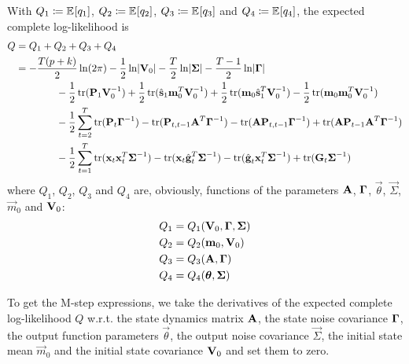 		With \( Q_1 \coloneqq \mathbb{E}_{}[q_1] \), \(  Q_2 \coloneqq \mathbb{E}_{}[q_2] \), \( Q_3 \coloneqq \mathbb{E}_{}[q_3] \) and \( Q_4 \coloneqq \mathbb{E}_{}[q_4] \), the expected complete log-likelihood is
		\begin{align*}
			Q
				&= Q_1 + Q_2 + Q_3 + Q_4 \\
				&= -\frac{T \paren{p + k}}{2} \ln \paren{2\pi} - \frac{1}{2} \ln \Det{\mat{V}_0} - \frac{T}{2} \ln \Det{\mat{\Sigma}} - \frac{T - 1}{2} \ln \Det{\mat{\Gamma}} \\
				&\qquad\qquad -\frac{1}{2} \tr\paren{\mat{P}_1 \mat{V}_0^{-1}} + \frac{1}{2} \tr\paren{\hat{\vec{s}}_1 \vec{m}_0^T \mat{V}_0^{-1}} + \frac{1}{2} \tr\paren{\vec{m}_0 \hat{\vec{s}}_1^T \mat{V}_0^{-1}} - \frac{1}{2} \tr\paren{\vec{m}_0 \vec{m}_0^T \mat{V}_0^{-1}} \\
				&\qquad\qquad -\frac{1}{2} \sum_{t = 2}^{T} \tr\paren{\mat{P}_t \mat{\Gamma}^{-1}} - \tr\paren{\mat{P}_{t, t - 1} \mat{A}^T \mat{\Gamma}^{-1}} - \tr\paren{\mat{A} \mat{P}_{t, t - 1} \mat{\Gamma}^{-1}} + \tr\paren{\mat{A} \mat{P}_{t - 1} \mat{A}^T \mat{\Gamma}^{-1}} \\
				&\qquad\qquad -\frac{1}{2} \sum_{t = 1}^{T} \tr\paren{ \vec{x}_t \vec{x}_t^T \mat{\Sigma}^{-1} } - \tr\paren{ \vec{x}_t \hat{\vec{g}}_t^T \mat{\Sigma}^{-1} } - \tr\paren{ \hat{\vec{g}}_t \vec{x}_t^T \mat{\Sigma}^{-1} } + \tr\paren{ \mat{G}_t \mat{\Sigma}^{-1} }
		\end{align*}
		where \( Q_1 \), \( Q_2 \), \( Q_3 \) and \( Q_4 \) are, obviously, functions of the parameters \( \boldsymbol{\mathrm{A}} \), \( \boldsymbol{\mathrm{\Gamma}} \), \( \vec{\theta} \), \( \vec{\Sigma} \), \( \vec{m}_0 \) and \( \boldsymbol{\mathrm{V}}_0 \):
		\begin{align*}
			Q_1 &= Q_1(\boldsymbol{\mathrm{V}}_0, \boldsymbol{\mathrm{\Gamma}}, \boldsymbol{\mathrm{\Sigma}}) \\
			Q_2 &= Q_2(\boldsymbol{\mathrm{m}}_0, \boldsymbol{\mathrm{V}}_0) \\
			Q_3 &= Q_3(\boldsymbol{\mathrm{A}}, \boldsymbol{\mathrm{\Gamma}}) \\
			Q_4 &= Q_4(\boldsymbol{\mathrm{\theta}}, \boldsymbol{\mathrm{\Sigma}})
		\end{align*}
		
		To get the M-step expressions, we take the derivatives of the expected complete log-likelihood \(Q\) w.r.t. the state dynamics matrix \( \boldsymbol{\mathrm{A}} \), the state noise covariance \( \boldsymbol{\mathrm{\Gamma}} \), the output function parameters \( \vec{\theta} \), the output noise covariance \( \vec{\Sigma} \), the initial state mean \( \vec{m}_0 \) and the initial state covariance \( \boldsymbol{\mathrm{V}}_0 \) and set them to zero.
		
